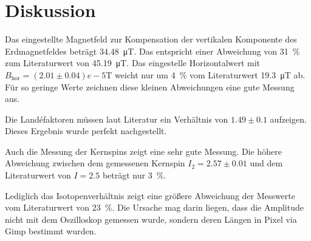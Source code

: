 \section{Diskussion}
\label{sec:Diskussion}
Das eingestellte Magnetfeld zur Kompensation der vertikalen Komponente des Erdmagnetfeldes beträgt \SI{34.48}{\micro\tesla}.
Das entspricht einer Abweichung von \SI{31}{\percent} zum Literaturwert \cite{noaa} von \SI{45.19}{\micro\tesla}.
Das eingestelle Horizontalwert mit $B_{\text{hor}}=(2.01\pm0.04)e-5\si{\tesla}$ weicht nur um \SI{4}{\percent} vom Literaturwert \SI{19.3}{\micro\tesla} ab.
Für so geringe Werte zeichnen diese kleinen Abweichungen eine gute Messung aus.

Die Landéfaktoren müssen laut Literatur \cite{wang} ein Verhältnis von $1.49\pm0.1$ aufzeigen.
Dieses Ergebnis wurde perfekt nachgestellt.

Auch die Messung der Kernspins zeigt eine sehr gute Messung.
Die höhere Abweichung zwischen dem gemessenen Kernspin $I_2=2.57\pm0.01$ und dem Literaturwert von $I=2.5$ beträgt nur \SI{3}{\percent}.

Lediglich das Isotopenverhältnis zeigt eine größere Abweichung der Messwerte vom Literaturwert von \SI{23}{\percent}.
Die Ursache mag darin liegen, dass die Amplitude nicht mit dem Oszilloskop gemessen wurde, sondern deren Längen in Pixel via Gimp bestimmt wurden.